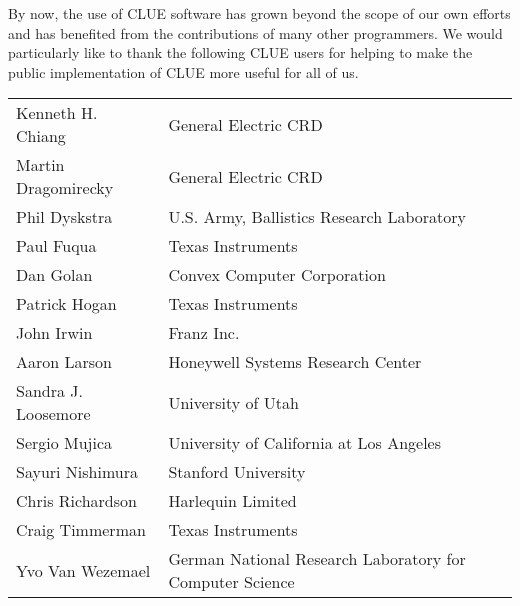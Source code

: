 By now, the use of CLUE software has grown beyond the scope of our own efforts
and has benefited from the contributions of many other programmers.  We would
particularly like to thank the following CLUE users for helping to make the
public implementation of CLUE more useful for all of us.

\begin{tabular}{ll}
Kenneth H. Chiang        & General Electric CRD\\
Martin Dragomirecky      & General Electric CRD\\
Phil Dyskstra            & U.S. Army, Ballistics Research Laboratory \\
Paul Fuqua               & Texas Instruments \\
Dan Golan                & Convex Computer Corporation \\
Patrick Hogan            & Texas Instruments \\
John Irwin               & Franz Inc.\\
Aaron Larson             & Honeywell Systems Research Center\\
Sandra J. Loosemore      & University of Utah \\
Sergio Mujica            & University of California at Los Angeles \\
Sayuri Nishimura         & Stanford University \\
Chris Richardson         & Harlequin Limited \\
Craig Timmerman          & Texas Instruments \\
Yvo Van Wezemael         & German National Research Laboratory for Computer Science\\ 
\end{tabular}


